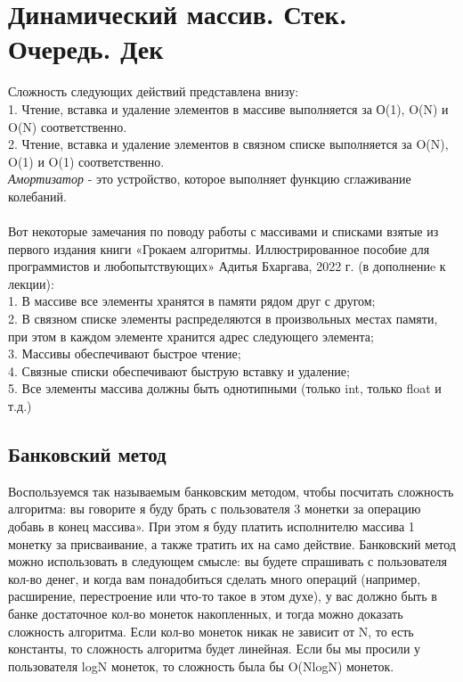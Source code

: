 \documentclass[a4paper,12pt]{article}
\begin{document}
\section{Динамический массив. Стек. Очередь. Дек}\label{second_sectio}
Сложность следующих действий представлена внизу:\\
1. Чтение, вставка и удаление элементов в массиве выполняется за О(1), O(N) и O(N) соответственно.\\
2. Чтение, вставка и удаление элементов в связном списке выполняется за O(N), O(1) и O(1) соответственно.\\
\textit{Амортизатор} - это устройство, которое выполняет функцию сглаживание колебаний.\\
\\
Вот некоторые замечания по поводу работы с массивами и списками взятые из первого издания книги «Грокаем алгоритмы. Иллюстрированное пособие для программистов и любопытствующих» Адитья Бхаргава, 2022 г. (в дополнениe к лекции):\\
1. В массиве все элементы хранятся в памяти рядом друг с другом;\\
2. В связном списке элементы распределяются в произвольных местах памяти, при этом в каждом элементе хранится адрес следующего элемента;\\
3. Массивы обеспечивают быстрое чтение;\\
4. Связные списки обеспечивают быструю вставку и удаление;\\
5. Все элементы массива должны быть однотипными (только int, только float и т.д.)
\subsection{Банковский метод}
Воспользуемся так называемым банковским методом, чтобы посчитать сложность алгоритма: вы говорите я буду брать с пользователя 3 монетки за операцию добавь в конец массива». При этом я буду платить исполнителю массива 1 монетку за присваивание, а также тратить их на само действие. Банковский метод можно использовать в следующем смысле: вы будете спрашивать с пользователя кол-во денег, и когда вам понадобиться сделать много операций (например, расширение, перестроение или что-то такое в этом духе), у вас должно быть в банке достаточное кол-во монеток накопленных, и тогда можно доказать сложность алгоритма. Если кол-во монеток никак не зависит от N, то есть константы, то сложность алгоритма будет линейная. Если бы мы просили у пользователя logN монеток, то сложность была бы O(NlogN) монеток.
\end{document}
